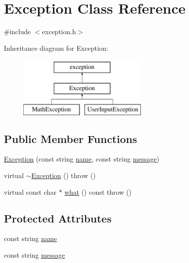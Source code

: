\hypertarget{classException}{\section{Exception Class Reference}
\label{classException}
}


{\ttfamily \#include $<$exception.\-h$>$}

Inheritance diagram for Exception\-:\begin{figure}[H]
\begin{center}
\leavevmode
\includegraphics[height=3.000000cm]{classException}
\end{center}
\end{figure}
\subsection*{Public Member Functions}
\begin{DoxyCompactItemize}
\item 
\hyperlink{classException_a9509cd7ac8060afe83e6a483a5037305}{Exception} (const string \hyperlink{classException_adcb29a6ce336e7223a521e19cbd286a7}{name}, const string \hyperlink{classException_a3d5051a55e7133196d3097a5cd2d58a7}{message})
\item 
virtual \hyperlink{classException_ad1ba411de295ef2eeb02ba26284a829a}{$\sim$\-Exception} ()  throw ()
\item 
virtual const char $\ast$ \hyperlink{classException_a78154a31544a609cbd226d32574f52cd}{what} () const   throw ()
\end{DoxyCompactItemize}
\subsection*{Protected Attributes}
\begin{DoxyCompactItemize}
\item 
const string \hyperlink{classException_adcb29a6ce336e7223a521e19cbd286a7}{name}
\item 
const string \hyperlink{classException_a3d5051a55e7133196d3097a5cd2d58a7}{message}
\end{DoxyCompactItemize}


